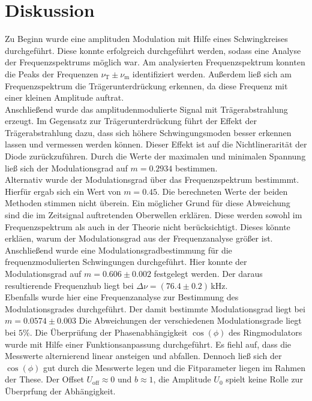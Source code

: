 \section{Diskussion}
\label{sec:Diskussion}
Zu Beginn wurde eine amplituden Modulation mit Hilfe eines Schwingkreises
durchgeführt. Diese konnte erfolgreich durchgeführt werden, sodass
eine Analyse der Frequenzspektrums möglich war. Am analysierten
Frequenzspektrum konnten die Peaks der Frequenzen $\nu_\text{T}\pm \nu_\text{m}$
identifiziert werden. Außerdem ließ sich am Frequenzspektrum die Trägerunterdrückung
erkennen, da diese Frequenz mit einer kleinen Amplitude auftrat.\\
Anschließend  wurde das amplitudenmodulierte Signal mit Trägerabstrahlung
erzeugt. Im Gegensatz zur Trägerunterdrückung führt der Effekt der Trägerabstrahlung
dazu, dass sich höhere Schwingungsmoden besser erkennen lassen und
vermessen werden können. Dieser Effekt ist auf die Nichtlinerarität der
Diode zurückzuführen. Durch die Werte der maximalen und minimalen Spannung
ließ sich der Modulationsgrad auf $m=0.2934$ bestimmen.\\
Alternativ wurde der Modulationsgrad über das Frequenzspektrum bestimmmt.
Hierfür ergab sich ein Wert von $m=0.45$. Die berechneten
Werte der beiden Methoden stimmen nicht überein. Ein möglicher
Grund für diese Abweichung sind die im Zeitsignal auftretenden Oberwellen
erklären. Diese werden sowohl im Frequenzspektrum als auch in der Theorie
nicht berücksichtigt. Dieses könnte erkläen, warum der Modulationsgrad aus
der Frequenzanalyse größer ist.\\
Anschließend wurde eine Modulationsgradbestimmung für die frequenzmodulierten
Schwingungen durchgeführt. Hier konnte der Modulationsgrad auf
$m=0.606 \pm 0.002$ festgelegt werden.  Der daraus resultierende
Frequenzhub liegt bei $\varDelta \nu=(76.4 \pm 0.2)\,$kHz.\\
Ebenfalls wurde hier eine Frequenzanalyse zur Bestimmung des Modulationsgrades
durchgeführt. Der damit bestimmte Modulationsgrad liegt bei $m=0.0574 \pm 0.003$
Die Abweichungen der verschiedenen Modulationsgrade liegt bei $5\%$.
Die Überprüfung der Phasenabhängigkeit $\cos(\phi)$  des Ringmodulators wurde
mit Hilfe einer Funktionsanpassung durchgeführt. Es fiehl auf, dass die Messwerte
alternierend linear ansteigen und abfallen. Dennoch ließ sich der $\cos(\phi)$
gut durch die Messwerte legen und die Fitparameter liegen im Rahmen der These.
Der Offset $U_\text{off}\approx 0$ und $b\approx 1$, die Amplitude $U_0$ spielt
keine Rolle zur Überprfung der Abhängigkeit.
